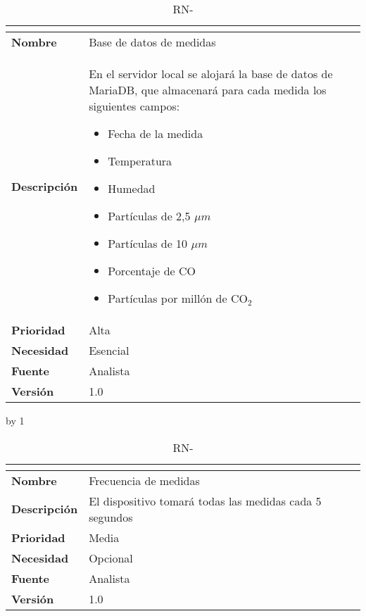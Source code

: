 \begin{table}[H]
	\caption{RN-\number\rn}
	\begin{tabular}{|l|p{}|}
		\hline
		\multicolumn{2}{|c|}{\cellcolor[HTML]{BFBFBF}{\color[HTML]{000000} \textbf{RN-\number\rn}}} \\ \hline
		\textbf{Nombre}      & Base de datos de medidas                                                                                            \\ \hline
		\textbf{Descripción} & En el servidor local se alojará la base de datos de MariaDB, que almacenará para cada medida los siguientes campos:
		\begin{itemize}
			\item Fecha de la medida
			\item Temperatura
			\item Humedad
			\item Partículas de 2,5 $\mu m$
			\item Partículas de 10 $\mu m$
			\item Porcentaje de CO
			\item Partículas por millón de CO$_2$
		\end{itemize}  \\ \hline
		\textbf{Prioridad}   & Alta                                                                                                                \\ \hline
		\textbf{Necesidad}   & Esencial                                                                                                            \\ \hline
		\textbf{Fuente}      & Analista                                                                                                            \\ \hline
		\textbf{Versión}     & 1.0                                                                                                                 \\ \hline
	\end{tabular}
\end{table}
\advance\rn by 1
\begin{table}[H]
	\caption{RN-\number\rn}
	\begin{tabular}{|l|p{}|}
		\hline
		\multicolumn{2}{|c|}{\cellcolor[HTML]{BFBFBF}{\color[HTML]{000000} \textbf{RN-\number\rn}}} \\ \hline
		\textbf{Nombre}      & Frecuencia de medidas                                   \\ \hline
		\textbf{Descripción} & El dispositivo tomará todas las medidas cada 5 segundos \\ \hline
		\textbf{Prioridad}   & Media                                                   \\ \hline
		\textbf{Necesidad}   & Opcional                                                \\ \hline
		\textbf{Fuente}      & Analista                                                \\ \hline
		\textbf{Versión}     & 1.0                                                     \\ \hline
	\end{tabular}
\end{table}

